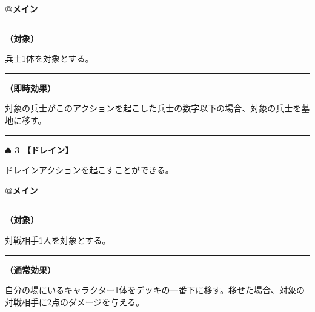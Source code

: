 \documentclass[twocolumn,a5paper,papersize,10pt]{jarticle}
\begin{document}
\begin{tcolorbox}[title={\small\bf【Action】スラッシュ}{\scriptsize （兵士起因）}]

{\scriptsize\bf @メイン }

\vspace{1mm} %
\hrule height 0.1mm depth 0mm width 62mm %
\vspace{1mm} %

{\bf（対象）}

兵士1体を対象とする。

\vspace{1mm} %
\hrule height 0.1mm depth 0mm width 62mm %
\vspace{1mm} %

{\bf（即時効果）}

対象の兵士がこのアクションを起こした兵士の数字以下の場合、対象の兵士を墓地に移す。

\vspace{1mm} %
\end{tcolorbox}

\vspace{-1zh}

 
 
 
 
 

\vspace{3mm} %
\hrule height 0.5mm depth 0mm width 66.5mm %
\vspace{1mm} %
{\Large\bf $\spadesuit$ 3} {\normalsize\bf【ドレイン】} %
\vspace{1mm} %

ドレインアクションを起こすことができる。

\begin{tcolorbox}[title={\small\bf【Action】ドレイン}{\scriptsize （通常魔法）}]

{\scriptsize\bf @メイン }

\vspace{1mm} %
\hrule height 0.1mm depth 0mm width 62mm %
\vspace{1mm} %

{\bf（対象）}

対戦相手1人を対象とする。

\vspace{1mm} %
\hrule height 0.1mm depth 0mm width 62mm %
\vspace{1mm} %

{\bf（通常効果）}

自分の場にいるキャラクター1体をデッキの一番下に移す。移せた場合、対象の対戦相手に2点のダメージを与える。

\vspace{1mm} %
\end{tcolorbox}
\end{document}
